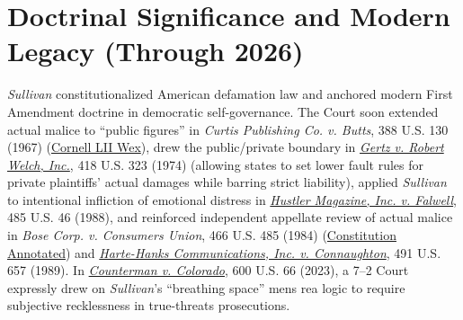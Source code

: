 \documentclass[12pt]{article}
\begin{document}
\section{Doctrinal Significance and Modern Legacy (Through 2026)}
\textit{Sullivan} constitutionalized American defamation law and anchored modern First Amendment doctrine in democratic self-governance. The Court soon extended actual malice to ``public figures'' in \textit{Curtis Publishing Co. v. Butts}, 388 U.S. 130 (1967) (\href{https://www.law.cornell.edu/wex/defamation}{Cornell LII Wex}), drew the public/private boundary in \textit{\href{https://supreme.justia.com/cases/federal/us/418/323/}{Gertz v. Robert Welch, Inc.}}, 418 U.S. 323 (1974) (allowing states to set lower fault rules for private plaintiffs' actual damages while barring strict liability), applied \textit{Sullivan} to intentional infliction of emotional distress in \textit{\href{https://supreme.justia.com/cases/federal/us/485/46/}{Hustler Magazine, Inc. v. Falwell}}, 485 U.S. 46 (1988), and reinforced independent appellate review of actual malice in \textit{Bose Corp. v. Consumers Union}, 466 U.S. 485 (1984) (\href{https://www.law.cornell.edu/constitution-conan/amendment-1/defamation}{Constitution Annotated}) and \textit{\href{https://supreme.justia.com/cases/federal/us/491/657/}{Harte-Hanks Communications, Inc. v. Connaughton}}, 491 U.S. 657 (1989). In \textit{\href{https://www.supremecourt.gov/opinions/22pdf/600us1r51_g3bi.pdf}{Counterman v. Colorado}}, 600 U.S. 66 (2023), a 7--2 Court expressly drew on \textit{Sullivan}'s ``breathing space'' mens rea logic to require subjective recklessness in true-threats prosecutions.
\end{document}
